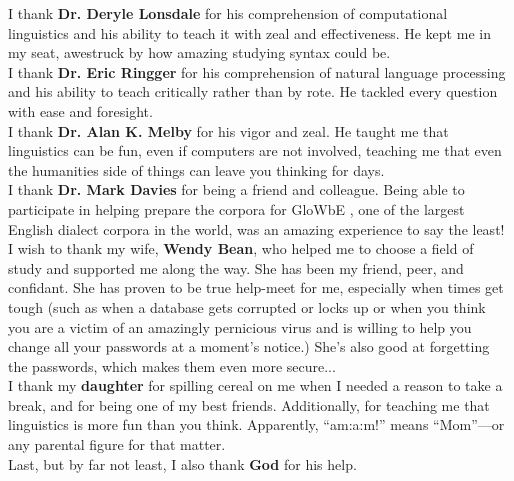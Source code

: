 I thank \textbf{Dr. Deryle Lonsdale} for his comprehension of computational linguistics and his ability to teach it with zeal and effectiveness. He kept me in my seat, awestruck by how amazing studying syntax could be.\\

I thank \textbf{Dr. Eric Ringger} for his comprehension of natural language processing and his ability to teach critically rather than by rote. He tackled every question with ease and foresight.\\

I thank \textbf{Dr. Alan K. Melby} for his vigor and zeal. He taught me that linguistics can be fun, even if computers are not involved, teaching me that even the humanities side of things can leave you thinking for days.\\%

I thank \textbf{Dr. Mark Davies} for being a friend and colleague. Being able to participate in helping prepare the corpora for GloWbE \cite{glowbe}, one of the largest English dialect corpora in the world, was an amazing experience to say the least!\\%

I wish to thank my wife, \textbf{Wendy Bean}, who helped me to choose a field of study and supported me along the way. %
She has been my friend, peer, and confidant. She has proven to be true help-meet for me, especially when times get tough (such as when a database gets corrupted or locks up or when you think you are a victim of an amazingly pernicious virus and is willing to help you change all your passwords at a moment's notice.) She's also good at forgetting the passwords, which makes them even more secure...\\

I thank my \textbf{daughter} for spilling cereal on me when I needed a reason to take a break, and for being one of my best friends. Additionally, for teaching me that linguistics is more fun than you think. Apparently, ``am:a:m!'' means ``Mom''---or any parental figure for that matter.\\

Last, but by far not least, I also thank \textbf{God} for his help.

